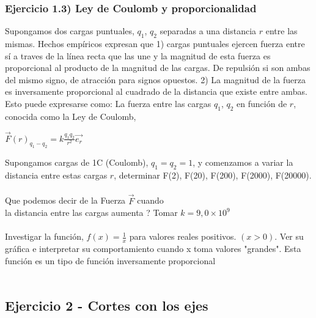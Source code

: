 \documentclass[11pt, a4paper]{article}
\begin{document}
 
\subsubsection*{ Ejercicio 1.3) Ley de Coulomb y proporcionalidad }
Supongamos dos cargas puntuales, $q_1$, $q_2$ separadas a una distancia $r$ entre las mismas. Hechos emp\'iricos expresan que 1) cargas puntuales ejercen fuerza entre s\'i a traves de la l\'inea recta que las une y la magnitud de esta fuerza es proporcional al producto de la magnitud de las cargas. De repulsi\'on si son ambas del mismo signo, de atracci\'on para signos opuestos. 2) La magnitud de la fuerza es inversamente proporcional al cuadrado de la distancia que existe entre ambas. Esto puede expresarse como: La fuerza entre las cargas $q_1$, $q_2$ en funci\'on de $r$, conocida como la Ley de Coulomb, 
\begin{center}
    $ \displaystyle  \vec{F}(r)_{q_1 - q_2} = k \frac{q_1q_2}{r^2} \vec{e_r} $
\end{center}
Supongamos cargas de 1C (Coulomb), $q_1= q_2 = 1$, y comenzamos a variar la distancia entre estas cargas $r$, determinar F(2), F(20), F(200), F(2000), F(20000). \\ \\
Que podemos decir de la Fuerza $\vec{F}$ cuando \\ la distancia entre las cargas aumenta ? Tomar $ k = 9,0 \times 10^9$ \\ \\ 
Investigar la funci\'on, $\displaystyle f(x) = \frac{1}{x}$ para valores reales positivos. $( x > 0 )$. Ver su gr\'afica e interpretar su comportamiento cuando x toma valores "grandes". Esta funci\'on es un tipo de funci\'on inversamente proporcional \\ \\

\subsection*{Ejercicio 2 - Cortes con los ejes }
\end{document}
